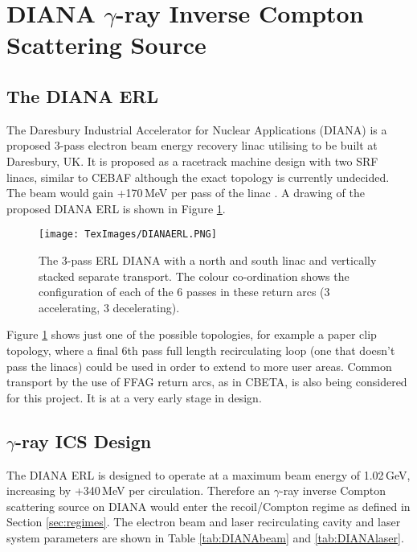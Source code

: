 \documentclass[11pt]{article}
\begin{document}
\section{DIANA $\gamma$-ray Inverse Compton Scattering Source}

\subsection{The DIANA ERL}

The Daresbury Industrial Accelerator for Nuclear Applications (DIANA) is a proposed 3-pass electron beam energy recovery linac utilising to be built at Daresbury, UK. It is proposed as a racetrack machine design with two SRF linacs, similar to CEBAF although the exact topology is currently undecided. The beam would gain +170\,MeV per pass of the linac \cite{PWDIANA}. A drawing of the proposed DIANA ERL is shown in Figure \ref{fig:DIANAdiag}. 

\begin{figure}[H]
\centering
\texttt{[image: TexImages/DIANAERL.PNG]}
\caption{\label{fig:DIANAdiag} The 3-pass ERL DIANA with a north and south linac and vertically stacked separate transport. The colour co-ordination shows the configuration of each of the 6 passes in these return arcs (3 accelerating, 3 decelerating).}
\end{figure}

Figure \ref{fig:DIANAdiag} shows just one of the possible topologies, for example a paper clip topology, where a final 6th pass full length recirculating loop (one that doesn't pass the linacs) could be used in order to extend to more user areas. Common transport by the use of FFAG return arcs, as in CBETA, is also being considered for this project. It is at a very early stage in design.

\subsection{$\gamma$-ray ICS Design}
\label{sec:DIANAICSdesign}

The DIANA ERL is designed to operate at a maximum beam energy of 1.02\,GeV, increasing by +340\,MeV per circulation. Therefore an $\gamma$-ray inverse Compton scattering source on DIANA would enter the recoil/Compton regime as defined in Section \ref{sec:regimes}. The electron beam and laser recirculating cavity and laser system parameters are shown in Table \ref{tab:DIANAbeam} and \ref{tab:DIANAlaser}.
\end{document}
